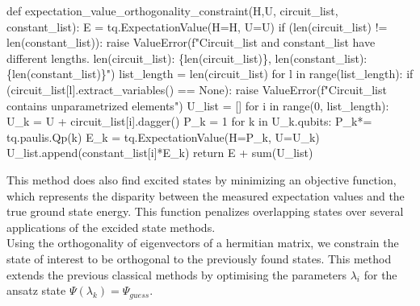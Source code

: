 \documentclass[
  letterpaper,
  DIV=11,
  numbers=noendperiod]{scrartcl}
\newenvironment{Shaded}{\begin{snugshade}}{\end{snugshade}}
\newcommand{\BuiltInTok}[1]{\textcolor[rgb]{0.00,0.23,0.31}{#1}}
\newcommand{\ControlFlowTok}[1]{\textcolor[rgb]{0.00,0.23,0.31}{#1}}
\newcommand{\DecValTok}[1]{\textcolor[rgb]{0.68,0.00,0.00}{#1}}
\newcommand{\KeywordTok}[1]{\textcolor[rgb]{0.00,0.23,0.31}{#1}}
\newcommand{\NormalTok}[1]{\textcolor[rgb]{0.00,0.23,0.31}{#1}}
\newcommand{\OperatorTok}[1]{\textcolor[rgb]{0.37,0.37,0.37}{#1}}
\newcommand{\PreprocessorTok}[1]{\textcolor[rgb]{0.68,0.00,0.00}{#1}}
\newcommand{\SpecialCharTok}[1]{\textcolor[rgb]{0.37,0.37,0.37}{#1}}
\newcommand{\SpecialStringTok}[1]{\textcolor[rgb]{0.13,0.47,0.30}{#1}}
\newcommand{\VariableTok}[1]{\textcolor[rgb]{0.07,0.07,0.07}{#1}}
\begin{document}
\begin{Shaded}
\begin{Highlighting}[]
\KeywordTok{def}\NormalTok{ expectation\_value\_orthogonality\_constraint(H,U, circuit\_list, constant\_list):}
\NormalTok{    E }\OperatorTok{=}\NormalTok{ tq.ExpectationValue(H}\OperatorTok{=}\NormalTok{H, U}\OperatorTok{=}\NormalTok{U)}
    \ControlFlowTok{if}\NormalTok{ (}\BuiltInTok{len}\NormalTok{(circuit\_list) }\OperatorTok{!=} \BuiltInTok{len}\NormalTok{(constant\_list)):}
        \ControlFlowTok{raise} \PreprocessorTok{ValueError}\NormalTok{(}\SpecialStringTok{f"Circuit\_list and constant\_list have different lengths. len(circuit\_list): \textquotesingle{}}\SpecialCharTok{\{}\BuiltInTok{len}\NormalTok{(circuit\_list)}\SpecialCharTok{\}}\SpecialStringTok{\textquotesingle{}, len(constant\_list): \textquotesingle{}}\SpecialCharTok{\{}\BuiltInTok{len}\NormalTok{(constant\_list)}\SpecialCharTok{\}}\SpecialStringTok{\textquotesingle{}"}\NormalTok{)}
\NormalTok{    list\_length }\OperatorTok{=} \BuiltInTok{len}\NormalTok{(circuit\_list)}
    \ControlFlowTok{for}\NormalTok{ l }\KeywordTok{in} \BuiltInTok{range}\NormalTok{(list\_length):}
        \ControlFlowTok{if}\NormalTok{ (circuit\_list[l].extract\_variables() }\OperatorTok{==} \VariableTok{None}\NormalTok{):}
            \ControlFlowTok{raise} \PreprocessorTok{ValueError}\NormalTok{(}\SpecialStringTok{f"Circuit\_list contains unparametrized elements"}\NormalTok{)}
\NormalTok{    U\_list }\OperatorTok{=}\NormalTok{ []}
    \ControlFlowTok{for}\NormalTok{ i }\KeywordTok{in} \BuiltInTok{range}\NormalTok{(}\DecValTok{0}\NormalTok{, list\_length):}
\NormalTok{        U\_k }\OperatorTok{=}\NormalTok{ U }\OperatorTok{+}\NormalTok{ circuit\_list[i].dagger()}
\NormalTok{        P\_k }\OperatorTok{=} \DecValTok{1}
        \ControlFlowTok{for}\NormalTok{ k }\KeywordTok{in}\NormalTok{ U\_k.qubits:}
\NormalTok{            P\_k}\OperatorTok{*=}\NormalTok{ tq.paulis.Qp(k)}
\NormalTok{        E\_k }\OperatorTok{=}\NormalTok{ tq.ExpectationValue(H}\OperatorTok{=}\NormalTok{P\_k, U}\OperatorTok{=}\NormalTok{U\_k)}
\NormalTok{        U\_list.append(constant\_list[i]}\OperatorTok{*}\NormalTok{E\_k)}
    \ControlFlowTok{return}\NormalTok{ E }\OperatorTok{+} \BuiltInTok{sum}\NormalTok{(U\_list)}
\end{Highlighting}
\end{Shaded}

This method does also find excited states by minimizing an objective
function, which represents the disparity between the measured
expectation values and the true ground state energy. This function
penalizes overlapping states over several applications of the excided
state methods.\\
Using the orthogonality of eigenvectors of a hermitian matrix, we
constrain the state of interest to be orthogonal to the previously found
states. This method extends the previous classical methods by optimising
the parameters \(\lambda _{i}\) for the ansatz state
\(\Psi (\lambda _{k}) = \Psi _{guess}\).
\end{document}
